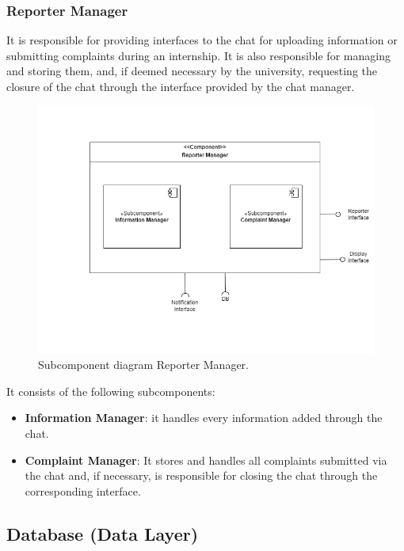 \subsubsection{Reporter Manager} It is responsible for providing interfaces to the chat for uploading information or submitting complaints during an internship. It is also responsible for managing and storing them, and, if deemed necessary by the university, requesting the closure of the chat through the interface provided by the chat manager.
\begin{figure}[htbp]
    \centering
    \includegraphics[width=\linewidth]{DD/Images/Comp&Sub/ComplaintManager.png}
    \caption{Subcomponent diagram Reporter Manager.}
    \label{fig:report_manager}
    \end{figure}
    
It consists of the following subcomponents:
\begin{itemize}
    \item  \textbf{Information Manager}: it handles every information added through the chat.
    \item  \textbf{Complaint Manager}: It stores and handles all complaints submitted via the chat and, if necessary, is responsible for closing the chat through the corresponding interface.
    \end{itemize}

\clearpage %

\subsection{Database (Data Layer)}
\label{subsec:data_layer}%

